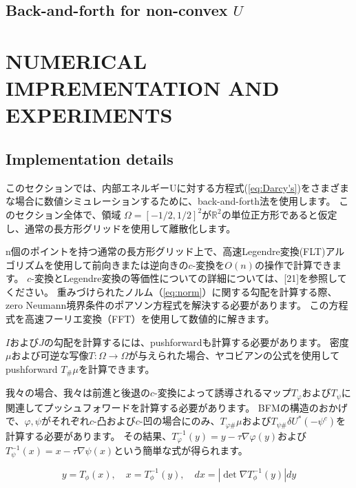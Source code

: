 \documentclass{jsarticle}
\theoremstyle{definition}
\begin{document}
\subsection{Back-and-forth for non-convex $U$}

\section{NUMERICAL IMPREMENTATION AND EXPERIMENTS}

\subsection{Implementation details}
\label{sect:Implementation details}

このセクションでは、内部エネルギーUに対する方程式(\ref{eq:Darcy's})をさまざまな場合に数値シミュレーションするために、back-and-forth法を使用します。
このセクション全体で、領域 $\Omega = [- 1 / 2, 1 / 2]^2$が$\mathbb{R}^2$の単位正方形であると仮定し、通常の長方形グリッドを使用して離散化します。

n個のポイントを持つ通常の長方形グリッド上で、高速Legendre変換(FLT)アルゴリズムを使用して前向きまたは逆向きの$c$-変換を$O(n)$の操作で計算できます。
$c$-変換とLegendre変換の等価性についての詳細については、[21]を参照してください。
重みづけられたノルム（\ref{eq:norm}）に関する勾配を計算する際、zero Neumann境界条件のポアソン方程式を解決する必要があります。
この方程式を高速フーリエ変換（FFT）を使用して数値的に解きます。

$I$および$J$の勾配を計算するには、pushforwardも計算する必要があります。
密度$\mu$および可逆な写像$T: \Omega \to \Omega$が与えられた場合、ヤコビアンの公式を使用してpushforward $T_\# \mu$を計算できます。

我々の場合、我々は前進と後退の$c$-変換によって誘導されるマップ$T_\varphi$および$T_\psi$に関連してプッシュフォワードを計算する必要があります。
BFMの構造のおかげで、$\varphi, \psi$がそれぞれ$c$-凸および$c$-凹の場合にのみ、$T_{\varphi \#} \mu$および$T_{\psi \#} \delta U^*(- \psi^c)$を計算する必要があります。
その結果、$T_\varphi ^{-1}(y) = y - \tau \nabla \varphi(y)$および$T_\psi^{-1}(x) = x - \tau \nabla \psi(x)$という簡単な式が得られます。

\[
    y = T_\phi(x), \quad x = T^{-1}_\phi (y), \quad dx = |\det \nabla T^{-1}_\phi (y)| dy 
\]
\end{document}
